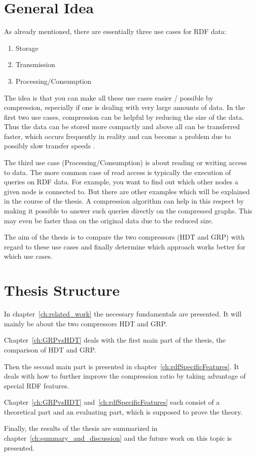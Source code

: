 \section{General Idea}

As already mentioned, there are essentially three use cases for RDF data:

\begin{enumerate}
	\item Storage
	\item Transmission
	\item Processing/Consumption
\end{enumerate}

The idea is that you can make all these use cases easier / possible by compression, especially if one is dealing with very large amounts of data. In the first two use cases, compression can be helpful by reducing the size of the data. Thus the data can be stored more compactly and above all can be transferred faster, which occurs frequently in reality and can become a problem due to possibly slow transfer speeds .

The third use case (Processing/Consumption) is about reading or writing access to data. The more common case of read access is typically the execution of queries on RDF data. For example, you want to find out which other nodes a given node is connected to. But there are other examples which will be explained in the course of the thesis. A compression algorithm can help in this respect by making it possible to answer such queries directly on the compressed graphs. This may even be faster than on the original data due to the reduced size.

The aim of the thesis is to compare the two compressors (HDT and GRP) with regard to these use cases and finally determine which approach works better for which use cases.



\section{Thesis Structure}

In chapter~\ref{ch:related_work} the necessary fundamentals are presented. It will mainly be about the two compressors HDT and GRP. 

Chapter~\ref{ch:GRPvsHDT} deals with the first main part of the thesis, the comparison of HDT and GRP. 

Then the second main part is presented in chapter~\ref{ch:rdfSpecificFeatures}. It deals with how to further improve the compression ratio by taking advantage of special RDF features. 

Chapter~\ref{ch:GRPvsHDT} and~\ref{ch:rdfSpecificFeatures} each consist of a theoretical part and an evaluating part, which is supposed to prove the theory.

Finally, the results of the thesis are summarized in chapter~\ref{ch:summary_and_discussion} and the future work on this topic is presented.








